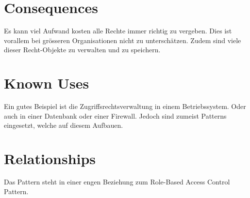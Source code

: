 \documentclass{article}
\begin{document}
\section{Consequences}
Es kann viel Aufwand kosten alle Rechte immer richtig zu vergeben. Dies ist vorallem bei grösseren Organisationen nicht zu unterschätzen. Zudem sind viele dieser Recht-Objekte zu verwalten und zu speichern.


\section{Known Uses}
Ein gutes Beispiel ist die Zugriffsrechtsverwaltung in einem Betriebssystem.
Oder auch in einer Datenbank oder einer Firewall. Jedoch sind zumeist Patterns eingesetzt, welche auf diesem Aufbauen.

\section{Relationships}
Das Pattern steht in einer engen Beziehung zum Role-Based Access Control Pattern.




\end{document}
